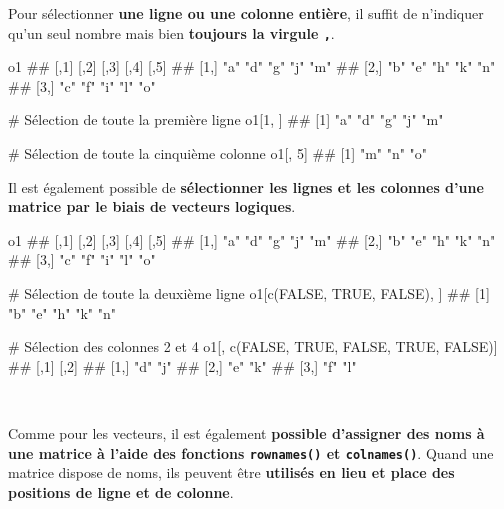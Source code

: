 \documentclass[12pt,twosided, notitlepage]{book}
\newenvironment{Shaded}{}{}
\newcommand{\KeywordTok}[1]{\textcolor[rgb]{0.00,0.00,1.00}{#1}}
\newcommand{\DecValTok}[1]{#1}
\newcommand{\CommentTok}[1]{\textcolor[rgb]{0.00,0.50,0.00}{#1}}
\newcommand{\OtherTok}[1]{\textcolor[rgb]{1.00,0.25,0.00}{#1}}
\newcommand{\NormalTok}[1]{#1}
\renewenvironment{Shaded}{\begin{snugshade}}{\end{snugshade}}
\begin{document}
Pour sélectionner \textbf{une ligne ou une colonne entière}, il suffit
de n'indiquer qu'un seul nombre mais bien \textbf{toujours la virgule
\texttt{,}}.

\begin{Shaded}
\begin{Highlighting}[]
\NormalTok{o1}
\NormalTok{  ##      [,1] [,2] [,3] [,4] [,5]}
\NormalTok{  ## [1,] "a"  "d"  "g"  "j"  "m" }
\NormalTok{  ## [2,] "b"  "e"  "h"  "k"  "n" }
\NormalTok{  ## [3,] "c"  "f"  "i"  "l"  "o"}

\CommentTok{# Sélection de toute la première ligne}
\NormalTok{o1[}\DecValTok{1}\NormalTok{, ]}
\NormalTok{  ## [1] "a" "d" "g" "j" "m"}

\CommentTok{# Sélection de toute la cinquième colonne}
\NormalTok{o1[, }\DecValTok{5}\NormalTok{]}
\NormalTok{  ## [1] "m" "n" "o"}
\end{Highlighting}
\end{Shaded}

Il est également possible de \textbf{sélectionner les lignes et les
colonnes d'une matrice par le biais de vecteurs logiques}.

\begin{Shaded}
\begin{Highlighting}[]
\NormalTok{o1}
\NormalTok{  ##      [,1] [,2] [,3] [,4] [,5]}
\NormalTok{  ## [1,] "a"  "d"  "g"  "j"  "m" }
\NormalTok{  ## [2,] "b"  "e"  "h"  "k"  "n" }
\NormalTok{  ## [3,] "c"  "f"  "i"  "l"  "o"}

\CommentTok{# Sélection de toute la deuxième ligne}
\NormalTok{o1[}\KeywordTok{c}\NormalTok{(}\OtherTok{FALSE}\NormalTok{, }\OtherTok{TRUE}\NormalTok{, }\OtherTok{FALSE}\NormalTok{), ]}
\NormalTok{  ## [1] "b" "e" "h" "k" "n"}

\CommentTok{# Sélection des colonnes 2 et 4}
\NormalTok{o1[, }\KeywordTok{c}\NormalTok{(}\OtherTok{FALSE}\NormalTok{, }\OtherTok{TRUE}\NormalTok{, }\OtherTok{FALSE}\NormalTok{, }\OtherTok{TRUE}\NormalTok{, }\OtherTok{FALSE}\NormalTok{)]}
\NormalTok{  ##      [,1] [,2]}
\NormalTok{  ## [1,] "d"  "j" }
\NormalTok{  ## [2,] "e"  "k" }
\NormalTok{  ## [3,] "f"  "l"}
\end{Highlighting}
\end{Shaded}

~

Comme pour les vecteurs, il est également \textbf{possible d'assigner
des noms à une matrice à l'aide des fonctions \texttt{rownames()} et
\texttt{colnames()}}.
Quand une matrice dispose de noms, ils peuvent être \textbf{utilisés en
lieu et place des positions de ligne et de colonne}.
\end{document}
